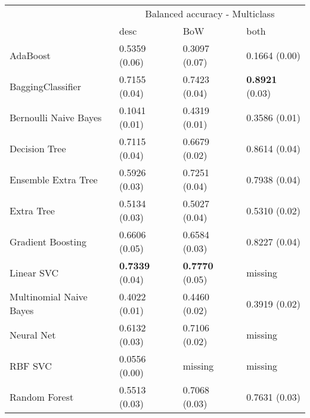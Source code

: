 \begin{tabular}{|l|l|l|l| }
\hline
 &  \multicolumn{3}{c|}{ Balanced accuracy - Multiclass} \\
\cline{2-4} & desc & BoW & both \\ \hline
AdaBoost                & 0.5359 (0.06) & 0.3097 (0.07) & 0.1664 (0.00)\\
BaggingClassifier       & 0.7155 (0.04) & 0.7423 (0.04) & {\bf 0.8921} (0.03)\\
Bernoulli Naive Bayes   & 0.1041 (0.01) & 0.4319 (0.01) & 0.3586 (0.01)\\
Decision Tree           & 0.7115 (0.04) & 0.6679 (0.02) & 0.8614 (0.04)\\
Ensemble Extra Tree     & 0.5926 (0.03) & 0.7251 (0.04) & 0.7938 (0.04)\\
Extra Tree              & 0.5134 (0.03) & 0.5027 (0.04) & 0.5310 (0.02)\\
Gradient Boosting       & 0.6606 (0.05) & 0.6584 (0.03) & 0.8227 (0.04)\\
Linear SVC              & {\bf 0.7339} (0.04) & {\bf 0.7770} (0.05) & missing \\
Multinomial Naive Bayes & 0.4022 (0.01) & 0.4460 (0.02) & 0.3919 (0.02)\\
Neural Net              & 0.6132 (0.03) & 0.7106 (0.02) & missing \\
RBF SVC                 & 0.0556 (0.00) & missing  & missing \\
Random Forest           & 0.5513 (0.03) & 0.7068 (0.03) & 0.7631 (0.03)\\
\hline
\end{tabular}